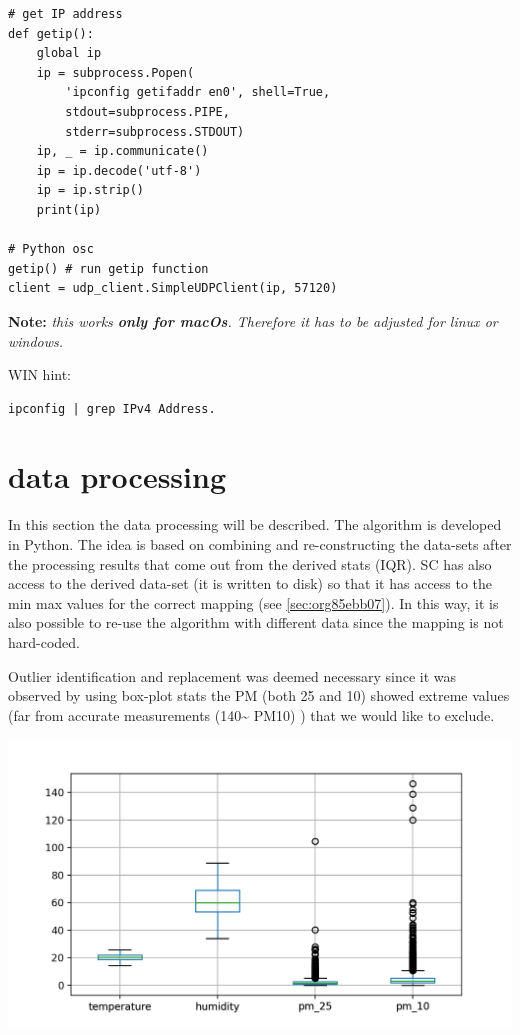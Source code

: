 \documentclass[11pt]{article}
\begin{document}
\begin{verbatim}
# get IP address
def getip():
    global ip
    ip = subprocess.Popen(
        'ipconfig getifaddr en0', shell=True,
        stdout=subprocess.PIPE,
        stderr=subprocess.STDOUT)
    ip, _ = ip.communicate()
    ip = ip.decode('utf-8')
    ip = ip.strip()
    print(ip)

# Python osc
getip() # run getip function
client = udp_client.SimpleUDPClient(ip, 57120)
\end{verbatim}
\textbf{Note:} \emph{this works \textbf{only for macOs}.  Therefore it has to be adjusted for linux or windows.}

\vspace{0.2cm}
\noindent
WIN hint:
\begin{verbatim}
ipconfig | grep IPv4 Address.
\end{verbatim}

\section{data processing}
\label{sec:org0e10ce2}
In this section the data processing will be described.  The algorithm is developed in Python.  The idea is based on combining and re-constructing the data-sets after the processing results that come out from the derived stats (IQR).  SC has also access to the derived data-set (it is written to disk) so that it has access to the min max values for the correct mapping (see \ref{sec:org85ebb07}).  In this way, it is also possible to re-use the algorithm with different data since the mapping is not hard-coded.

Outlier identification and replacement was deemed necessary since it was observed by using box-plot stats the PM (both 25 and 10) showed extreme values (far from accurate measurements (140\textasciitilde{} PM10) ) that we would like to exclude.

\begin{center}
\includegraphics[width=.9\linewidth]{./boxplot.png}
\end{center}
\end{document}
